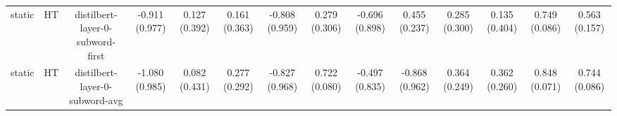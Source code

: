 \begin{sidewaystable}[htb]
\begin{tabular}{@{}cccccccccccccc@{}}
        static & HT & distilbert-layer-0-subword-first & -0.911 (0.977) & 0.127 (0.392) & 0.161 (0.363) & -0.808 (0.959) & 0.279 (0.306) & -0.696 (0.898) & 0.455 (0.237) & 0.285 (0.300) & 0.135 (0.404) & 0.749 (0.086) & 0.563 (0.157) \\
        static & HT & distilbert-layer-0-subword-avg & -1.080 (0.985) & 0.082 (0.431) & 0.277 (0.292) & -0.827 (0.968) & 0.722 (0.080) & -0.497 (0.835) & -0.868 (0.962) & 0.364 (0.249) & 0.362 (0.260) & 0.848 (0.071) & 0.744 (0.086) \\
        \bottomrule
    \end{tabular}
\end{sidewaystable}